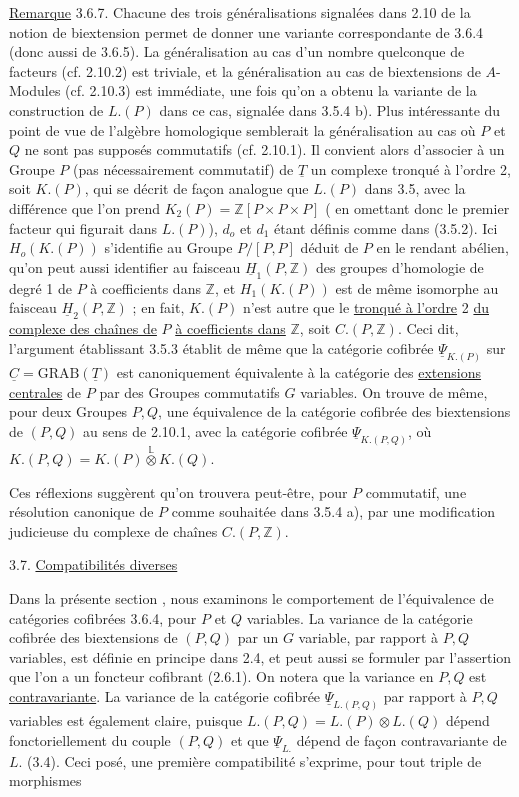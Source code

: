 \underline{Remarque} 3.6.7. Chacune des trois généralisations signalées dans 2.10 de la notion de biextension permet de donner une variante correspondante de 3.6.4 (donc aussi de 3.6.5). La généralisation au cas d'un nombre quelconque de facteurs (cf. 2.10.2) est triviale, et la généralisation au cas de biextensions de $A$-Modules (cf. 2.10.3) est immédiate, une fois qu'on a obtenu la variante de la construction de $L.(P)$ dans ce cas, signalée dans 3.5.4 b). Plus intéressante du point de vue de l'algèbre homologique semblerait la généralisation au cas où $P$ et $Q$ ne sont pas supposés commutatifs (cf. 2.10.1). Il convient alors d'associer à un Groupe $P$ (pas nécessairement commutatif) de $\underline{T}$ un complexe tronqué à l'ordre 2, soit $K.(P)$, qui se décrit de façon analogue que $L.(P)$ dans 3.5, avec la différence que l'on prend $K_2(P) = \mathbb{Z}[P \times P \times P]$ ( en omettant donc le premier facteur qui figurait dans $L.(P)$), $d_o$ et $d_1$ étant définis comme dans (3.5.2). Ici $H_o(K.(P))$ s'identifie au Groupe $P/[P,P]$ déduit de $P$ en le rendant abélien, qu'on peut aussi identifier au faisceau $\underline{H}_1(P,\mathbb{Z})$ des groupes d'homologie de degré 1 de $P$ à coefficients dans $\mathbb{Z}$, et $H_1(K.(P))$ est de même isomorphe au faisceau $\underline{H}_2(P,\mathbb{Z} )$ ; en fait, $K.(P)$ n'est autre que le \underline{tronqué à l'ordre} 2 \underline{du complexe des chaînes de} $P$ \underline{à coefficients dans} $\mathbb{Z}$, soit $C.(P,\mathbb{Z} )$. Ceci dit, l'argument établissant 3.5.3 établit de même que la catégorie cofibrée $\underline{\Psi}_{K.(P)}$ sur $\underline{C} = \mathrm{GRAB}(\underline{T})$ est
canoniquement équivalente à la catégorie des \underline{extensions centrales} de $P$ par des Groupes commutatifs $G$ variables. On trouve de même, pour deux Groupes $P,Q$, une équivalence de la catégorie cofibrée des biextensions de $(P,Q)$ au sens de 2.10.1, avec la catégorie cofibrée $\underline{\Psi}_{K.(P,Q)}$, où $K.(P,Q) = K.(P) \overset{\mathbb{L}}{\otimes} K.(Q)$.

Ces réflexions suggèrent qu'on trouvera peut-être, pour $P$ commutatif, une résolution canonique de $P$ comme souhaitée dans 3.5.4 a), par une modification judicieuse du complexe de chaînes $C.(P,\mathbb{Z} )$.


3.7. \underline{Compatibilités diverses}

Dans la présente section , nous examinons le comportement de l'équivalence de catégories cofibrées 3.6.4, pour $P$ et $Q$ variables. La variance de la catégorie cofibrée des biextensions de $(P,Q)$ par un $G$ variable, par rapport à $P,Q$ variables, est définie en principe dans 2.4, et peut aussi se formuler par l'assertion que l'on a un foncteur cofibrant (2.6.1). On notera que la variance en $P,Q$ est \underline{contravariante}. La variance de la catégorie cofibrée $\underline{\Psi}_{L.(P,Q)}$ par rapport à $P,Q$ variables est également claire, puisque $L.(P,Q) = L.(P) \otimes L.(Q)$ dépend fonctoriellement du couple $(P,Q)$ et que $\underline{\Psi}_{L.}$ dépend de façon contravariante de $L.$ (3.4). Ceci posé, une première compatibilité s'exprime, pour tout triple de morphismes

